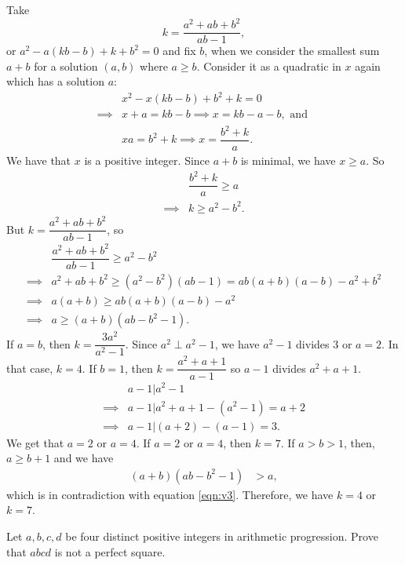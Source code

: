 \documentclass{subfile}
\begin{document}
	\begin{solution}
		Take \[k=\dfrac{a^2+ab+b^2}{ab-1},\] or $a^2-a(kb-b)+k+b^2=0$ and fix $b$, when we consider the smallest sum $a+b$ for a solution $(a,b)$ where $a\geq b$. Consider it as a quadratic in $x$ again which has a solution $a$:
			\begin{align*}
				& x^2-x(kb-b)+b^2+k = 0\\
				\implies & x+a = kb-b \implies x = kb-a-b, \text{ and }\\
				 & xa =b^2+k \implies x = \dfrac{b^2+k}{a}.
			\end{align*}
		We have that $x$ is a positive integer. Since $a+b$ is minimal, we have $x\geq a$. So
			\begin{align*}
				& \dfrac{b^2+k}{a} \geq a\\
				\implies &  k \geq a^2-b^2.
			\end{align*}
		But $k=\dfrac{a^2+ab+b^2}{ab-1}$, so
			\begin{align}
				& \dfrac{a^2+ab+b^2}{ab-1} \geq a^2-b^2\nonumber\\
				\implies & a^2+ab+b^2  \geq (a^2-b^2)(ab-1)= ab(a+b)(a-b)-a^2+b^2\nonumber\\
				\implies & a(a+b)  \geq ab(a+b)(a-b)-a^2\nonumber\\
				\implies & a  \geq (a+b)(ab-b^2-1).\label{eqn:v3}
			\end{align}
		If $a=b$, then $k=\dfrac{3a^2}{a^2-1}$. Since $a^2\perp a^2-1$, we have $a^2-1$ divides $3$ or $a=2$. In that case, $k=4$. If $b=1$, then $k=\dfrac{a^2+a+1}{a-1}$ so $a-1$ divides $a^2+a+1$.
			\begin{align*}
				& a-1 | a^2-1\\
				\implies & a-1 |a^2+a+1-(a^2-1) =a+2\\
				\implies & a-1 | (a+2)-(a-1)=3.
			\end{align*}
		We get that $a=2$ or $a=4$. If $a=2$ or $a=4$, then $k=7$. If $a>b>1$, then, $a\geq b+1$ and we have
			\begin{align*}
				(a+b)(ab-b^2-1) & > a,
			\end{align*}
		which is in contradiction with equation \eqref{eqn:v3}. Therefore, we have $k=4$ or $k=7$.
	\end{solution}

	\begin{problem}
		Let $ a,b,c,d$ be four distinct positive integers in arithmetic progression. Prove that $ abcd$ is not a perfect square.
	\end{problem}
\end{document}
